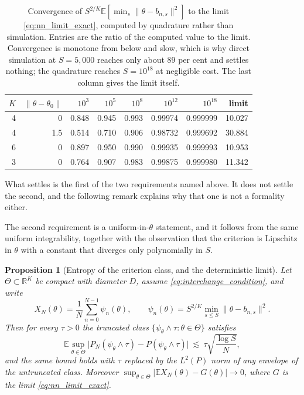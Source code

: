 \documentclass[11pt]{article}
\newtheorem{proposition}[proposition]{Proposition}
\theoremstyle{definition}
\newcommand{\R}{\mathbb{R}}
\newcommand{\E}{\mathbb{E}}
\newcommand{\thetao}{\theta_0}
\begin{document}
\begin{table}[htbp]
\centering
\caption{Convergence of $S^{2/K}\E[\min_s\lVert\theta-b_{n,s}\rVert^2]$ to the limit \eqref{eq:nn_limit_exact}, computed by quadrature rather than simulation. Entries are the ratio of the computed value to the limit. Convergence is monotone from below and slow, which is why direct simulation at $S=5{,}000$ reaches only about $89$ per cent and settles nothing; the quadrature reaches $S=10^{18}$ at negligible cost. The last column gives the limit itself.}
\label{tab:nn_convergence}
\begin{tabular}{rrrrrrrr}
\toprule
$K$ & $\lVert\theta-\thetao\rVert$ & $10^3$ & $10^5$ & $10^8$ & $10^{12}$ & $10^{18}$ & limit \\
\midrule
4 & 0 & 0.848 & 0.945 & 0.993 & 0.99974 & 0.999999 & 10.027 \\
4 & 1.5 & 0.514 & 0.710 & 0.906 & 0.98732 & 0.999692 & 30.884 \\
6 & 0 & 0.897 & 0.950 & 0.990 & 0.99935 & 0.999993 & 10.953 \\
3 & 0 & 0.764 & 0.907 & 0.983 & 0.99875 & 0.999980 & 11.342 \\
\bottomrule
\end{tabular}
\end{table}

\FloatBarrier
What  settles is the first of the two requirements named above. It does not settle the second, and the following remark explains why that one is not a formality either.

The second requirement is a uniform-in-$\theta$ statement, and it follows from the same uniform integrability, together with the observation that the criterion is Lipschitz in $\theta$ with a constant that diverges only polynomially in $S$.

\begin{proposition}[Entropy of the criterion class, and the deterministic limit]\label{prop:uniform_lln}
Let $\Theta\subset\R^K$ be compact with diameter $D$, assume \eqref{eq:interchange_condition}, and write
\[
X_N(\theta)=\frac1N\sum_{n=0}^{N-1}\psi_n(\theta),
\qquad
\psi_n(\theta)=S^{2/K}\min_{s\le S}\lVert\theta-b_{n,s}\rVert^2 .
\]
Then for every $\tau>0$ the truncated class $\{\psi_\theta\wedge\tau:\theta\in\Theta\}$ satisfies
\begin{equation}\label{eq:uniform_condition}
\E\sup_{\theta\in\Theta}\bigl\lvert P_N(\psi_\theta\wedge\tau)-P(\psi_\theta\wedge\tau)\bigr\rvert
\ \lesssim\ \tau\sqrt{\frac{\log S}{N}},
\end{equation}
and the same bound holds with $\tau$ replaced by the $L^2(P)$ norm of any envelope of the untruncated class. Moreover $\sup_{\theta\in\Theta}\lvert\E X_N(\theta)-G(\theta)\rvert\to0$, where $G$ is the limit \eqref{eq:nn_limit_exact}.
\end{proposition}
\end{document}
